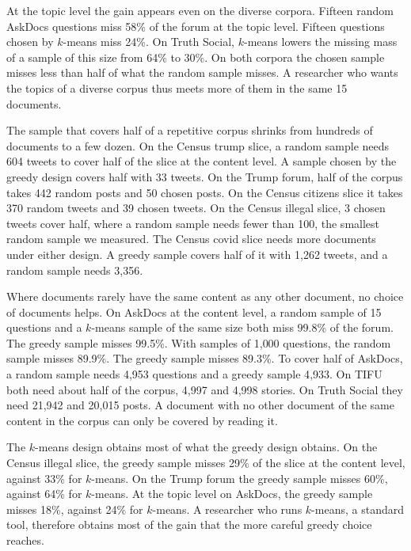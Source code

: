 

At the topic level the gain appears even on the diverse corpora. Fifteen random AskDocs questions miss 58\% of the forum at the topic level. Fifteen questions chosen by $k$-means miss 24\%. On Truth Social, $k$-means lowers the missing mass of a sample of this size from 64\% to 30\%. On both corpora the chosen sample misses less than half of what the random sample misses. A researcher who wants the topics of a diverse corpus thus meets more of them in the same 15 documents.

The sample that covers half of a repetitive corpus shrinks from hundreds of documents to a few dozen. On the Census trump slice, a random sample needs 604 tweets to cover half of the slice at the content level. A sample chosen by the greedy design covers half with 33 tweets. On the Trump forum, half of the corpus takes 442 random posts and 50 chosen posts. On the Census citizens slice it takes 370 random tweets and 39 chosen tweets. On the Census illegal slice, 3 chosen tweets cover half, where a random sample needs fewer than 100, the smallest random sample we measured. The Census covid slice needs more documents under either design. A greedy sample covers half of it with 1{,}262 tweets, and a random sample needs 3{,}356.

Where documents rarely have the same content as any other document, no choice of documents helps. On AskDocs at the content level, a random sample of 15 questions and a $k$-means sample of the same size both miss 99.8\% of the forum. The greedy sample misses 99.5\%. With samples of 1{,}000 questions, the random sample misses 89.9\%. The greedy sample misses 89.3\%. To cover half of AskDocs, a random sample needs 4{,}953 questions and a greedy sample 4{,}933. On TIFU both need about half of the corpus, 4{,}997 and 4{,}998 stories. On Truth Social they need 21{,}942 and 20{,}015 posts. A document with no other document of the same content in the corpus can only be covered by reading it.

The $k$-means design obtains most of what the greedy design obtains. On the Census illegal slice, the greedy sample misses 29\% of the slice at the content level, against 33\% for $k$-means. On the Trump forum the greedy sample misses 60\%, against 64\% for $k$-means. At the topic level on AskDocs, the greedy sample misses 18\%, against 24\% for $k$-means. A researcher who runs $k$-means, a standard tool, therefore obtains most of the gain that the more careful greedy choice reaches.

